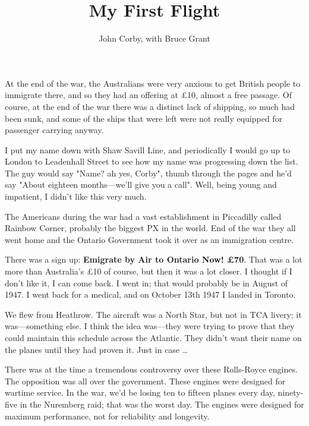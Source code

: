 %


\title{My First Flight}
\author{John Corby, with Bruce Grant}

\maketitle

At the end of the war, the Australians were very anxious to get
British people to immigrate there, and so they had an offering at
\pounds10, almost a free passage. Of course, at the end of the war
there was a distinct lack of shipping, so much had been sunk, and some
of the ships that were left were not really equipped for passenger
carrying anyway.

I put my name down with Shaw Savill Line, and periodically I would go
up to London to Leadenhall Street to see how my name was progressing
down the list. The guy would say "Name? ah yes, Corby", thumb through
the pages and he'd say "About eighteen months---we'll give you a
call". Well, being young and impatient, I didn't like this very much.

The Americans during the war had a vast establishment in Piccadilly
called Rainbow Corner, probably the biggest PX in the world. End of
the war they all went home and the Ontario Government took it over as
an immigration centre.

There was a sign up: \textbf{Emigrate by Air to Ontario Now!
  \pounds70}.  That was a lot more than Australia's \pounds10 of
course, but then it was a lot closer. I thought if I don't like it, I
can come back.  I went in; that would probably be in August of 1947. I
went back for a medical, and on October 13th 1947 I landed in Toronto.

We flew from Heathrow. The aircraft was a North Star, but not in TCA
livery; it was---something else. I think the idea was---they were
trying to prove that they could maintain this schedule across the
Atlantic. They didn't want their name on the planes until they had
proven it. Just in case \ldots

There was at the time a tremendous controversy over these Rolls-Royce
engines. The opposition was all over the government. These engines
were designed for wartime service. In the war, we'd be losing ten to
fifteen planes every day, ninety-five in the Nuremberg raid; that was
the worst day. The engines were designed for maximum performance, not
for reliability and longevity.

